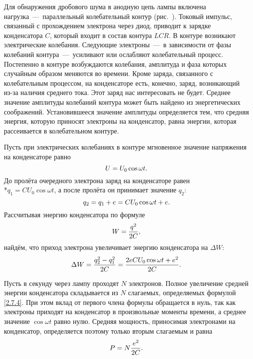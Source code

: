 Для обнаружения дробового шума в анодную цепь лампы включена
нагрузка~---~параллельный колебательный контур (рис.~).
Токовый импульс, связанный с прохождением электрона через диод, приводит к
зарядке конденсатора $C$, который входит в
состав контура $LCR$. В контуре возникают электрические колебания. Следующие
электроны~---~в зависимости от фазы
колебаний контура~---~усиливают или ослабляют колебательный процесс. Постепенно
в контуре возбуждаются колебания,
амплитуда и фаза которых случайным образом меняются во времени. Кроме заряда,
связанного с колебательным процессом, на
конденсаторе есть, конечно, заряд, возникающий из-за наличия среднего тока. Этот
заряд нас интересовать не будет.
Среднее значение амплитуды колебаний контура может быть найдено из
энергетических соображений. Установившееся значение
амплитуды определяется тем, что средняя энергия, которую приносят электроны на
конденсатор, равна энергии, которая
рассеивается в колебательном контуре.

Пусть при электрических колебаниях в контуре мгновенное значение напряжения на
конденсаторе равно
\begin{equation}
	\eqmark{2.7.1}
	U=U_0\cos\omega t.
\end{equation}
До пролёта очередного электрона заряд на конденсаторе равен\\*$q_1 =
CU_0\cos\omega t$, а после пролёта он принимает значение
$q_2$:
\begin{equation}
	\eqmark{2.7.2}
	q_2=q_1+e=CU_0\cos\omega t+e.
\end{equation}
Рассчитывая энергию конденсатора по формуле
\begin{equation}
	\eqmark{2.7.3}
	W=\frac{q^2}{2C},
\end{equation}
найдём, что приход электрона увеличивает энергию конденсатора на $\Delta W$:
\begin{equation}
	\eqmark{2.7.4}
	\Delta W=\frac{q_2^2-q_1^2}{2C}=\frac{2eCU_0\cos\omega t+e^2}{2C}.
\end{equation}

Пусть в секунду через лампу проходят $N$ электронов. Полное увеличение средней
энергии конденсатора складывается из $N$
слагаемых, определяемых формулой \eqref{2.7.4}. При этом вклад от первого члена
формулы обращается в нуль, так как электроны
приходят на конденсатор в произвольные моменты времени, а среднее значение
$\cos\omega t$ равно нулю. Средняя мощность,
приносимая электронами на конденсатор, определяется поэтому только вторым
слагаемым и равна
\begin{equation}
	\eqmark{2.7.5}
	P=N\frac{e^2}{2C}.
\end{equation}

